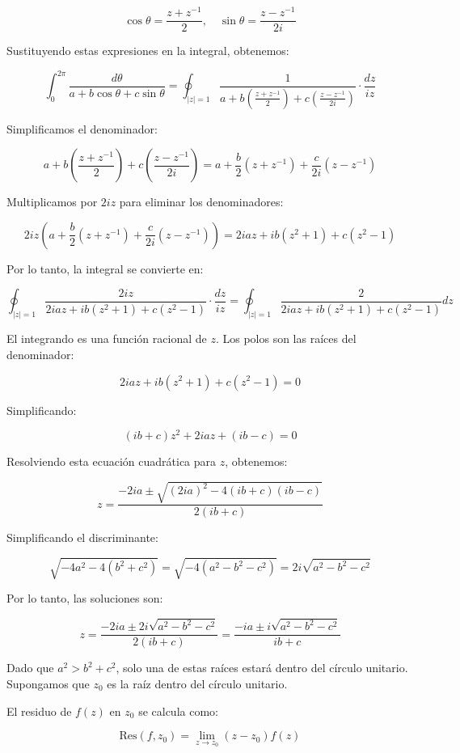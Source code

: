 \documentclass[a4paper,12pt]{article}
\begin{document}
\[
\cos\theta = \frac{z + z^{-1}}{2}, \quad \sin\theta = \frac{z - z^{-1}}{2i}
\]

Sustituyendo estas expresiones en la integral, obtenemos:

\[
\int_{0}^{2\pi} \frac{d\theta}{a + b\cos\theta + c\sin\theta} = \oint_{|z|=1} \frac{1}{a + b\left(\frac{z + z^{-1}}{2}\right) + c\left(\frac{z - z^{-1}}{2i}\right)} \cdot \frac{dz}{iz}
\]

Simplificamos el denominador:

\[
a + b\left(\frac{z + z^{-1}}{2}\right) + c\left(\frac{z - z^{-1}}{2i}\right) = a + \frac{b}{2}(z + z^{-1}) + \frac{c}{2i}(z - z^{-1})
\]

Multiplicamos por \( 2iz \) para eliminar los denominadores:

\[
2iz \left(a + \frac{b}{2}(z + z^{-1}) + \frac{c}{2i}(z - z^{-1})\right) = 2iaz + ib(z^2 + 1) + c(z^2 - 1)
\]

Por lo tanto, la integral se convierte en:

\[
\oint_{|z|=1} \frac{2iz}{2iaz + ib(z^2 + 1) + c(z^2 - 1)} \cdot \frac{dz}{iz} = \oint_{|z|=1} \frac{2}{2iaz + ib(z^2 + 1) + c(z^2 - 1)} dz
\]

El integrando es una función racional de \( z \). Los polos son las raíces del denominador:

\[
2iaz + ib(z^2 + 1) + c(z^2 - 1) = 0
\]

Simplificando:

\[
(ib + c)z^2 + 2iaz + (ib - c) = 0
\]

Resolviendo esta ecuación cuadrática para \( z \), obtenemos:

\[
z = \frac{-2ia \pm \sqrt{(2ia)^2 - 4(ib + c)(ib - c)}}{2(ib + c)}
\]

Simplificando el discriminante:

\[
\sqrt{-4a^2 - 4(b^2 + c^2)} = \sqrt{-4(a^2 - b^2 - c^2)} = 2i\sqrt{a^2 - b^2 - c^2}
\]

Por lo tanto, las soluciones son:

\[
z = \frac{-2ia \pm 2i\sqrt{a^2 - b^2 - c^2}}{2(ib + c)} = \frac{-ia \pm i\sqrt{a^2 - b^2 - c^2}}{ib + c}
\]

Dado que \( a^2 > b^2 + c^2 \), solo una de estas raíces estará dentro del círculo unitario. Supongamos que \( z_0 \) es la raíz dentro del círculo unitario.


El residuo de \( f(z) \) en \( z_0 \) se calcula como:

\[
\text{Res}(f, z_0) = \lim_{z \to z_0} (z - z_0) f(z)
\]
\end{document}
